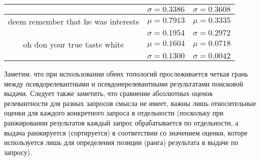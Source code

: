\begin{table}[tbp]
\begin{center}
\begin{tabular}{ccc}
                                                      & \(\sigma=0.3386\)                                 & \(\sigma=0.3608\)           \\
            \midrule
            deem  remember that he was interests      & \(\mu=0.7913\)                                    & \(\mu=0.3335\)              \\
                                                      & \(\sigma=0.1954\)                                 & \(\sigma=0.2972\)           \\
            \midrule
            oh don  your true taste white             & \(\mu=0.1604\)                                    & \(\mu=0.0718\)              \\
                                                      & \(\sigma=0.1300\)                                 & \(\sigma=0.0042\)           \\
            \bottomrule
        \end{tabular}\label{tab3}
    \end{center}
\end{table}
Заметим, что при использовании обеих топологий прослеживается четкая грань между псевдорелевантными и псевдонерелевантными результатами поисковой выдачи.
Следует также заметить, что сравнение абсолютных оценок релевантности для разных запросов смысла не имеет, важны лишь относительные оценки для каждого 
конкретного запроса в отдельности (поскольку при ранжировании результатов каждый запрос обрабатывается по отдельности, а выдача ранжируется (сортируется)
в соответствии со значением оценки, которе используется лишь для определения позиции (ранга) результата в выдаче по запросу).

